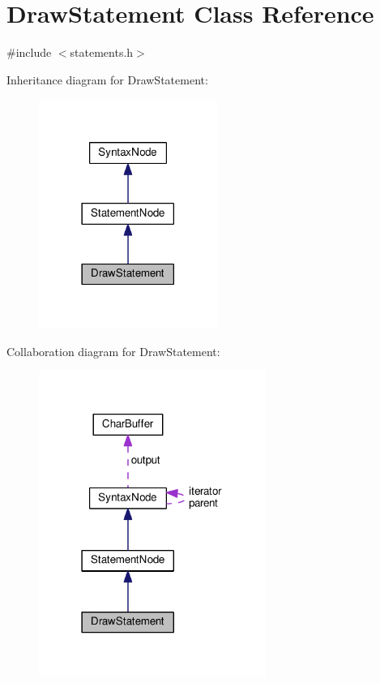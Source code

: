 \hypertarget{classDrawStatement}{}\section{Draw\+Statement Class Reference}
\label{classDrawStatement}


{\ttfamily \#include $<$statements.\+h$>$}



Inheritance diagram for Draw\+Statement\+:
\nopagebreak
\begin{figure}[H]
\begin{center}
\leavevmode
\includegraphics[width=165pt]{d9/d4b/classDrawStatement__inherit__graph}
\end{center}
\end{figure}


Collaboration diagram for Draw\+Statement\+:
\nopagebreak
\begin{figure}[H]
\begin{center}
\leavevmode
\includegraphics[width=210pt]{d8/d75/classDrawStatement__coll__graph}
\end{center}
\end{figure}
